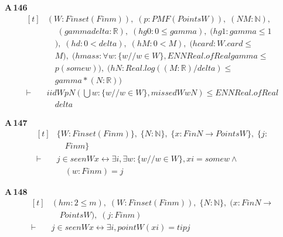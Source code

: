 \noindent\textbf{A\,146}\quad{}
{\footnotesize\[ \begin{aligned}[t]
&(\mathit{W} : \mathit{Finset} (\mathit{Fin} \mathit{m})),\; (\mathit{p} : \mathit{PMF} (\mathit{Points} \mathit{W})),\; (\mathit{N} \mathit{M} : \mathbb{N} ),\\
&\quad \; (\mathit{gamma} \mathit{delta} : \mathbb{R} ),\; (\mathit{hg0} : 0 \leq \mathit{gamma}),\; (\mathit{hg1} : \mathit{gamma} \leq 1\\
&\quad ),\; (\mathit{hd} : 0 < \mathit{delta}),\; (\mathit{hM} : 0 < \mathit{M}),\; (\mathit{hcard} : \mathit{W}.\mathit{card} \leq\\
&\quad \mathit{M}),\; (\mathit{hmass} : \forall \mathit{w} : \{ \mathit{w} // \mathit{w} \in \mathit{W}\} , \mathit{ENNReal}.\mathit{ofReal} \mathit{gamma} \leq\\
&\quad \mathit{p} (\mathit{some} \mathit{w})),\; (\mathit{hN} : \mathit{Real}.\mathit{log} ((\mathit{M}:\mathbb{R} )/\mathit{delta}) \leq\\
&\quad \mathit{gamma}*(\mathit{N}:\mathbb{R} ))\\
\vdash\;&\mathit{iid} \mathit{W} \mathit{p} \mathit{N} (⋃ \mathit{w} : \{ \mathit{w} // \mathit{w} \in \mathit{W}\} , \mathit{missed} \mathit{W} \mathit{w} \mathit{N}) \leq \mathit{ENNReal}.\mathit{ofReal}\\
&\quad \mathit{delta}
\end{aligned} \]}

\noindent\textbf{A\,147}\quad{}
{\footnotesize\[ \begin{aligned}[t]
&\{ \mathit{W} : \mathit{Finset} (\mathit{Fin} \mathit{m})\},\; \{ \mathit{N} : \mathbb{N} \},\; \{ \mathit{x} : \mathit{Fin} \mathit{N} \to \mathit{Points} \mathit{W}\},\; \{ \mathit{j} :\\
&\quad \mathit{Fin} \mathit{m}\}\\
\vdash\;&\mathit{j} \in \mathit{seen} \mathit{W} \mathit{x} \leftrightarrow \exists \mathit{i}, \exists \mathit{w} : \{ \mathit{w} // \mathit{w} \in \mathit{W}\} , \mathit{x} \mathit{i} = \mathit{some} \mathit{w} \wedge\\
&\quad (\mathit{w} : \mathit{Fin} \mathit{m}) = \mathit{j}
\end{aligned} \]}

\noindent\textbf{A\,148}\quad{}
{\footnotesize\[ \begin{aligned}[t]
&(\mathit{hm} : 2 \leq \mathit{m}),\; (\mathit{W} : \mathit{Finset} (\mathit{Fin} \mathit{m})),\; \{ \mathit{N} : \mathbb{N} \},\; (\mathit{x} : \mathit{Fin} \mathit{N} \to\\
&\quad \mathit{Points} \mathit{W}),\; (\mathit{j} : \mathit{Fin} \mathit{m})\\
\vdash\;&\mathit{j} \in \mathit{seen} \mathit{W} \mathit{x} \leftrightarrow \exists \mathit{i}, \mathit{point} \mathit{W} (\mathit{x} \mathit{i}) = \mathit{tip} \mathit{j}
\end{aligned} \]}

